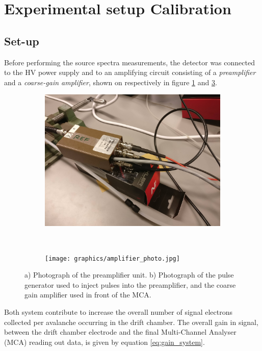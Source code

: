 \section{Experimental setup Cali\-bra\-ti\-on}

\subsection{Set-up}
\label{sec:calibration:set-up}
Before performing the source spectra measurements, the detector was connected to the HV power supply and to an amplifying circuit consisting of a \textit{preamplifier} and a \textit{coarse-gain amplifier}, shown on respectively in figure \ref{fig:preamp_photo} and \ref{fig:ampli_gene}. 

\begin{figure}[htb]
  \begin{subfigure}[b]{0.45\textwidth}
    \includegraphics[width=\textwidth]{graphics/preamplifier.jpg}
    \caption{}
    \label{fig:preamp_photo}
  \end{subfigure}
  ~
  \begin{subfigure}[b]{0.5\textwidth}
    \texttt{[image: graphics/amplifier\_photo.jpg]}
    \caption{}
    \label{fig:ampli_gene}
  \end{subfigure}
  \caption{a) Photograph of the preamplifier unit. b) Photograph of the pulse generator used to inject pulses into the preamplifier, and the coarse gain amplifier used in front of the MCA.}
\end{figure}

Both system contribute to increase the overall number of signal electrons collected per avalanche occurring in the drift chamber. The overall gain in signal, between the drift chamber electrode and the final Multi-Channel Analyser (MCA) reading out data, is given by equation \ref{eq:gain_system}.

